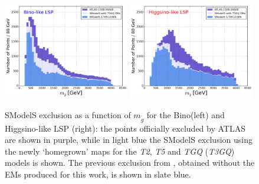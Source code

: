 \documentclass[a4paper,11pt]{article}
\newcommand{\MGLU}{$ m _{ \tilde g } $\xspace}
\begin{document}
\begin{figure}[!]
\begin{center}
\subfigure
\includegraphics[width=0.49\textwidth]{PLOTS/BINO_Comparison_Gluino.png}
\subfigure
{\includegraphics[width=0.49\textwidth]{PLOTS/HIGGSINO_Comparison_Gluino.png}}
\end{center}
\caption{SModelS exclusion as a function of \MGLU for the Bino(left) and Higgsino-like LSP (right): the points officially excluded by ATLAS are shown in purple, while in light blue the SModelS exclusion using the newly `homegrown' maps for the \textit{T2}, \textit{T5} and \textit{TGQ} (\textit{T3GQ}) models is shown. The previous exclusion from \cite{Ambrogi:2017lov}, obtained without the EMs produced for this work, is shown in slate blue.} 
\label{pmssm_new_exclusion_gluino}
\end{figure}
%
\end{document}
